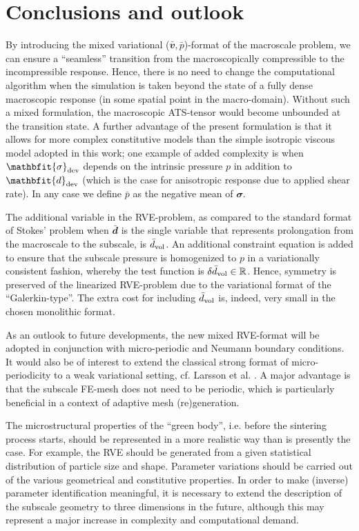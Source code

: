 \documentclass[12pt,a4paper,fleqn]{article}
\renewcommand{\ts}[1]{\mathbfit{#1}}
\begin{document}
\section{Conclusions and outlook}\label{sec:conlusions}

By introducing the mixed variational ($\bar{\ts v},\bar{p}$)-format of the macroscale problem, we can ensure a ``seamless'' transition from the macroscopically compressible to the incompressible response. Hence, there is no need to change the computational algorithm when the simulation is taken beyond the state of a fully dense macroscopic response (in some spatial point in the macro-domain). Without such a mixed formulation, the macroscopic ATS-tensor would become unbounded at the transition state. A further advantage of the present formulation is that it allows for more complex constitutive models than the simple isotropic viscous model adopted in this work; one example of added complexity is when $\ts\sigma_\dev$ depends on the intrinsic pressure $p$ in addition to $\ts d_\dev$ (which is the case for anisotropic response due to applied shear rate). In any case we define $\bar{p}$ as the negative mean of $\ts\sigma$.

The additional variable in the RVE-problem, as compared to the standard format of Stokes' problem when $\bar{\ts d}$ is the single variable that represents prolongation from the macroscale to the subscale, is $\bar d_{\mathrm{vol}}$. An additional constraint equation is added to ensure that the subscale pressure is homogenized to $p$ in a variationally consistent fashion, whereby the test function is $\delta\bar d_{\mathrm{vol}}\in\mathbb{R}$. Hence, symmetry is preserved of  the linearized RVE-problem due to the variational format of the ``Galerkin-type''. The extra cost for including $\bar d_{\mathrm{vol}}$ is, indeed, very small in the chosen monolithic format. 

As an outlook to future developments, the new mixed RVE-format will be adopted in conjunction with micro-periodic and Neumann boundary conditions.
It would also be of interest to extend the classical strong format of micro-periodicity to a weak variational setting, cf. Larsson et al. \cite{Larsson_etal2011}.
A major advantage is that the subscale FE-mesh does not need to be periodic, which is particularly beneficial in a context of adaptive mesh (re)generation. 

The microstructural properties of the ``green body'', i.e. before the sintering process starts, should be represented in a more realistic way than is presently the case.
For example, the RVE should be generated from a given statistical distribution of particle size and shape.
Parameter variations should be carried out of the various geometrical and constitutive properties.
In order to make (inverse) parameter identification meaningful, it is necessary to extend the description of the subscale geometry to three dimensions in the future, although this may represent a major increase in complexity and computational demand. 
\end{document}

